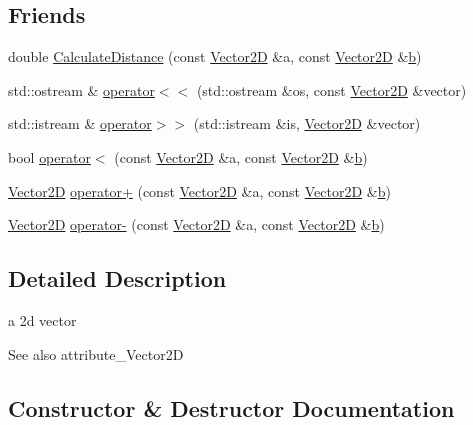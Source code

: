 \subsection*{Friends}
\begin{DoxyCompactItemize}
\item 
double \hyperlink{classns3_1_1Vector2D_ae17f0bb09a310c1e62e1cf2f0f667486}{Calculate\+Distance} (const \hyperlink{classns3_1_1Vector2D}{Vector2D} \&a, const \hyperlink{classns3_1_1Vector2D}{Vector2D} \&\hyperlink{lte__pathloss_8m_a21ad0bd836b90d08f4cf640b4c298e7c}{b})
\item 
std\+::ostream \& \hyperlink{classns3_1_1Vector2D_a1b4a096260d50f4901e78b2d0744c521}{operator$<$$<$} (std\+::ostream \&os, const \hyperlink{classns3_1_1Vector2D}{Vector2D} \&vector)
\item 
std\+::istream \& \hyperlink{classns3_1_1Vector2D_a0988ee7b872298c88d80e00e7062de20}{operator$>$$>$} (std\+::istream \&is, \hyperlink{classns3_1_1Vector2D}{Vector2D} \&vector)
\item 
bool \hyperlink{classns3_1_1Vector2D_a6a34eeff8daedb4141f46609905271cf}{operator$<$} (const \hyperlink{classns3_1_1Vector2D}{Vector2D} \&a, const \hyperlink{classns3_1_1Vector2D}{Vector2D} \&\hyperlink{lte__pathloss_8m_a21ad0bd836b90d08f4cf640b4c298e7c}{b})
\item 
\hyperlink{classns3_1_1Vector2D}{Vector2D} \hyperlink{classns3_1_1Vector2D_aa025c19d4e3859ac5cdcdf7301fb31b0}{operator+} (const \hyperlink{classns3_1_1Vector2D}{Vector2D} \&a, const \hyperlink{classns3_1_1Vector2D}{Vector2D} \&\hyperlink{lte__pathloss_8m_a21ad0bd836b90d08f4cf640b4c298e7c}{b})
\item 
\hyperlink{classns3_1_1Vector2D}{Vector2D} \hyperlink{classns3_1_1Vector2D_ac638052636e6afad1ec34e1bc40610bd}{operator-\/} (const \hyperlink{classns3_1_1Vector2D}{Vector2D} \&a, const \hyperlink{classns3_1_1Vector2D}{Vector2D} \&\hyperlink{lte__pathloss_8m_a21ad0bd836b90d08f4cf640b4c298e7c}{b})
\end{DoxyCompactItemize}


\subsection{Detailed Description}
a 2d vector 

\begin{DoxySeeAlso}{See also}
attribute\+\_\+\+Vector2D 
\end{DoxySeeAlso}


\subsection{Constructor \& Destructor Documentation}
